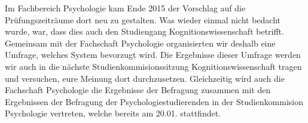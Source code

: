 Im Fachbereich Psychologie kam Ende 2015 der Vorschlag auf die Prüfungszeiträume dort neu zu gestalten. Was wieder einmal nicht bedacht wurde, war, dass dies auch den Studiengang Kognitionswissenschaft betrifft. Gemeinsam mit der Fachschaft Psychologie organisierten wir deshalb eine Umfrage, welches System bevorzugt wird. Die Ergebnisse dieser Umfrage werden wir auch in die nächste Studienkommisionssitzung Kognitionswissenschaft tragen und versuchen, eure Meinung dort durchzusetzen.
Gleichzeitig wird auch die Fachschaft Psychologie die Ergebnisse der Befragung zusammen mit den Ergebnissen der Befragung der Psychologiestudierenden in der Studienkommision Psychologie vertreten, welche bereits am 20.01. stattfindet. 
